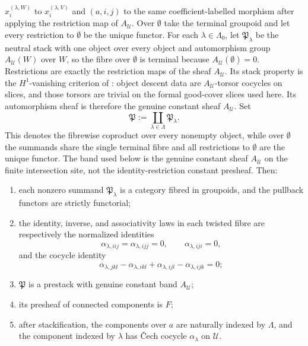 \begin{lemma}
$x_i^{(\lambda,W)}$ to $x_i^{(\lambda,V)}$ and $(a,i,j)$ to the same
coefficient-labelled morphism after applying the restriction map of
\(A_{\mathcal U}\). Over $\emptyset$ take the terminal groupoid and let
every restriction to $\emptyset$ be the unique functor. For each
$\lambda\in\Lambda_0$, let $\mathfrak P_\lambda$ be the neutral stack with
one object over every object and automorphism group
\(A_{\mathcal U}(W)\) over \(W\), so the fibre over \(\emptyset\) is
terminal because \(A_{\mathcal U}(\emptyset)=0\). Restrictions are exactly
the restriction maps of the sheaf \(A_{\mathcal U}\). Its stack property is
the \(H^1\)-vanishing criterion of
: object descent data are
\(A_{\mathcal U}\)-torsor cocycles on slices, and those torsors are
trivial on the formal good-cover slices used here. Its automorphism sheaf is
therefore the genuine constant sheaf $A_{\mathcal U}$. Set
\[
\mathfrak P:=\coprod_{\lambda\in\Lambda}\mathfrak P_\lambda.
\]
This denotes the fibrewise coproduct over every nonempty object, while over
$\emptyset$ the summands share the single terminal fibre and all
restrictions to $\emptyset$ are the unique functor. The band used below is
the genuine constant sheaf $A_{\mathcal U}$ on the finite intersection site, not the
identity-restriction constant presheaf.
Then:
\begin{enumerate}[label=(\roman*),nosep]
\item each nonzero summand $\mathfrak P_\lambda$ is a category fibred in groupoids, and the pullback functors are strictly functorial;
\item the identity, inverse, and associativity laws in each twisted fibre are respectively the normalized identities
\[
\alpha_{\lambda,iij}=\alpha_{\lambda,ijj}=0,
\qquad
\alpha_{\lambda,iji}=0,
\]
and the cocycle identity
\[
\alpha_{\lambda,jkl}-\alpha_{\lambda,ikl}
+\alpha_{\lambda,ijl}-\alpha_{\lambda,ijk}=0;
\]
\item $\mathfrak P$ is a prestack with genuine constant band $A_{\mathcal U}$;
\item its presheaf of connected components is $F$;
\item after stackification, the components over $a$ are naturally indexed by $\Lambda$, and the component indexed by $\lambda$ has \v{C}ech cocycle $\alpha_\lambda$ on $\mathcal U$.
\end{enumerate}
\end{lemma}

